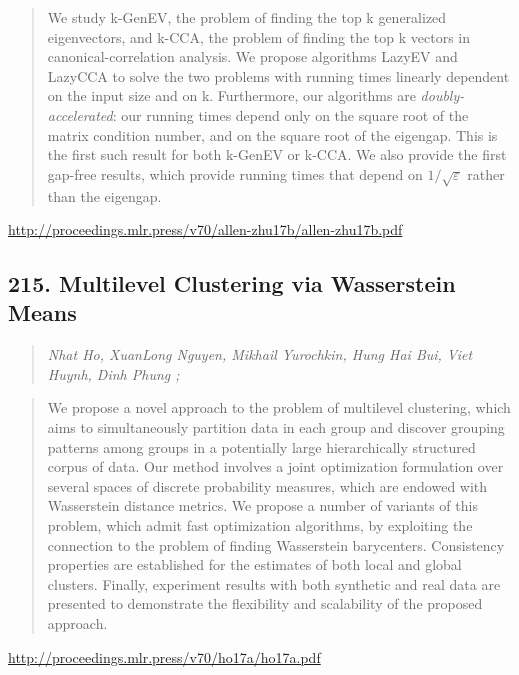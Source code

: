 \documentclass{article}
\begin{document}
\begin{quote}
    We study k-GenEV, the problem of finding the top k generalized eigenvectors, and k-CCA, the problem of finding the top k vectors in canonical-correlation analysis. We propose algorithms LazyEV and LazyCCA to solve the two problems with running times linearly dependent on the input size and on k. Furthermore, our algorithms are \textit{doubly-accelerated}: our running times depend only on the square root of the matrix condition number, and on the square root of the eigengap. This is the first such result for both k-GenEV or k-CCA. We also provide the first gap-free results, which provide running times that depend on $1/\sqrt{\varepsilon}$ rather than the eigengap.  
\end{quote}

\href{http://proceedings.mlr.press/v70/allen-zhu17b/allen-zhu17b.pdf}{http://proceedings.mlr.press/v70/allen-zhu17b/allen-zhu17b.pdf}

\subsection{215. Multilevel Clustering via Wasserstein Means}

\begin{quote}
\footnotesize{\textit{Nhat Ho, XuanLong Nguyen, Mikhail Yurochkin, Hung Hai Bui, Viet Huynh, Dinh Phung ;}}

\end{quote}

\begin{quote}
    We propose a novel approach to the problem of multilevel clustering, which aims to simultaneously partition data in each group and discover grouping patterns among groups in a potentially large hierarchically structured corpus of data. Our method involves a joint optimization formulation over several spaces of discrete probability measures, which are endowed with Wasserstein distance metrics. We propose a number of variants of this problem, which admit fast optimization algorithms, by exploiting the connection to the problem of finding Wasserstein barycenters. Consistency properties are established for the estimates of both local and global clusters. Finally, experiment results with both synthetic and real data are presented to demonstrate the flexibility and scalability of the proposed approach.  
\end{quote}

\href{http://proceedings.mlr.press/v70/ho17a/ho17a.pdf}{http://proceedings.mlr.press/v70/ho17a/ho17a.pdf}
\end{document}
